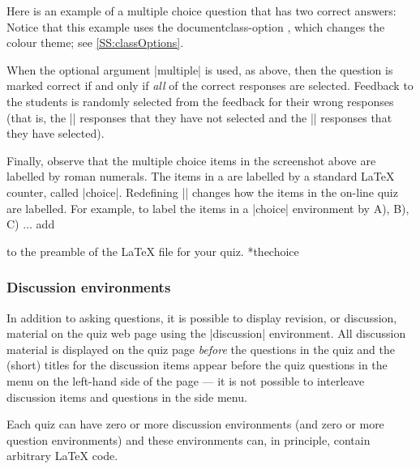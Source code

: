 \documentclass[svgnames]{article}
\makeatletter
\newcommand\macroIndex[1]{%
  \lowercase{\def\temp{#1}}%
  \expandafter\index\expandafter{\temp@\textbackslash#1}%
}
\makeatother
\begin{document}
  Here is an example of a multiple choice question that has
  two correct answers:
    \label{choice-multiple}
  Notice that this example uses the documentclass-option
  , which changes the \WebQuiz colour theme;
  see \autoref{SS:classOptions}.

  When the optional argument \LatexCode|multiple| is used, as above,
  then the question is marked correct if and only if \textit{all} of the
  correct responses are selected. Feedback to the students is randomly
  selected from the feedback for their wrong responses (that is, the
  \LatexCode|\correct| responses that they have not selected and the
  \LatexCode|\incorrect| responses that they have selected).

  Finally, observe that the multiple choice items in the screenshot
  above are labelled by roman numerals. The items in a
   are labelled by a standard \LaTeX{} counter, called
  \LatexCode|choice|. Redefining \LatexCode|\thechoice| changes how the
  items in the on-line quiz are labelled. For example, to label the
  items in a \LatexCode|choice| environment by A), B), C) $\dots$ add
  \begin{latexcode}
    \renewcommand\thechoice{\Alph{choice})}
  \end{latexcode}
  to the preamble of the \LaTeX{} file for your quiz.
  *{thechoice}\macroIndex{thechoice}

  \subsubsection{Discussion environments}\label{SS:discussion}

  In addition to asking questions, it is possible to display revision,
  or discussion, material on the quiz web page using the
  \LatexCode|discussion| environment.  All discussion material is
  displayed on the quiz page \textit{before} the questions in the quiz
  and the (short) titles for the discussion items appear before the quiz
  questions in the menu on the left-hand side of the page --- it is
  not possible to interleave discussion items and questions in the side
  menu.

  Each quiz can have zero or more discussion
  environments (and zero or more question environments) and these
  environments can, in principle, contain arbitrary \LaTeX{} code.
\end{document}
